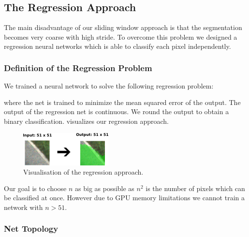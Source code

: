 \subsection{The Regression Approach}

The main disadvantage of our sliding window approach is that the segmentation becomes very coarse with high stride. To overcome this problem we designed a regression neural networks which is able to classify each pixel independently.

\subsubsection{Definition of the Regression Problem}

We trained a neural network to solve the following regression problem:


where the net is trained to minimize the mean squared error of the output. The output of the regression net is continuous. We round the output to obtain a binary classification.   visualizes our regression approach.

\begin{figure}[H]
	\centering
	\includegraphics[width=0.5\columnwidth]{figures/models/fully-conv.png}
	\caption{Visualisation of the regression approach.}
	\label{fig:reg}
\end{figure}

Our goal is to choose $n$ as big as possible as $n^2$ is the number of pixels which can be classified at once. However due to GPU memory limitations we cannot train a network with $n > 51$.





\subsubsection{Net Topology}

